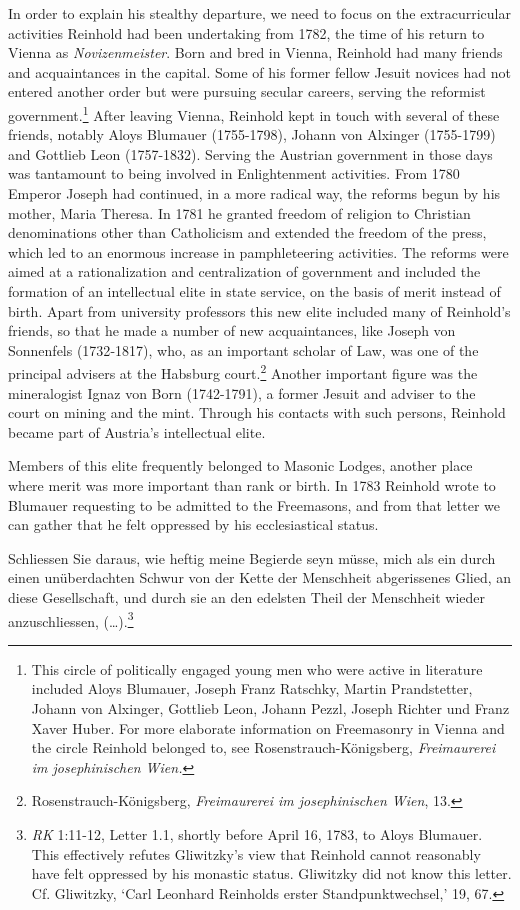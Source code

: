  In order to explain his stealthy departure, we need to focus on the extracurricular activities Reinhold had been undertaking from 1782, the time of his return to Vienna as \textit{Novizenmeister}. Born and bred in Vienna, Reinhold had many friends and acquaintances in the capital. Some of his former fellow Jesuit novices had not entered another order but were pursuing secular careers, serving the reformist government.\footnote{ This circle of politically engaged young men who were active in literature included Aloys Blumauer, Joseph Franz Ratschky, Martin Prandstetter, Johann von Alxinger, Gottlieb Leon, Johann Pezzl, Joseph Richter und Franz Xaver Huber. For more elaborate information on Freemasonry in Vienna and the circle Reinhold belonged to, see Rosenstrauch{-}K\"{o}nigsberg, \textit{Freimaurerei im josephinischen Wien. }} After leaving Vienna, Reinhold kept in touch with several of these friends, notably Aloys Blumauer (1755{-}1798), Johann von Alxinger (1755{-}1799) and Gottlieb Leon (1757{-}1832). Serving the Austrian government in those days was tantamount to being involved in Enlightenment activities. From 1780 Emperor Joseph had continued, in a more radical way, the reforms begun by his mother, Maria Theresa. In 1781 he granted freedom of religion to Christian denominations other than Catholicism and extended the freedom of the press, which led to an enormous increase in pamphleteering activities. The reforms were aimed at a rationalization and centralization of government and included the formation of an intellectual elite in state service, on the basis of merit instead of birth. Apart from university professors this new elite included many of Reinhold's friends, so that he made a number of new acquaintances, like Joseph von Sonnenfels (1732{-}1817), who, as an important scholar of Law, was one of the principal advisers at the Habsburg court.\footnote{ Rosenstrauch{-}K\"{o}nigsberg, \textit{Freimaurerei im josephinischen Wien}, 13.} Another important figure was the mineralogist Ignaz von Born (1742{-}1791), a former Jesuit and adviser to the court on mining and the mint. Through his contacts with such persons, Reinhold became part of Austria's intellectual elite. 

Members of this elite frequently belonged to Masonic Lodges, another place where merit was more important than rank or birth. In 1783 Reinhold wrote to Blumauer requesting to be admitted to the Freemasons, and from that letter we can gather that he felt oppressed by his ecclesiastical status. 

Schliessen Sie daraus, wie heftig meine Begierde seyn m\"{u}sse, mich als ein durch einen un\"{u}berdachten Schwur von der Kette der Menschheit abgerissenes Glied, an diese Gesellschaft, und durch sie an den edelsten Theil der Menschheit wieder anzuschliessen, (\ldots ).\footnote{ \textit{RK} 1:11{-}12, Letter 1.1, shortly before April 16, 1783, to Aloys Blumauer. This effectively refutes Gliwitzky's view that Reinhold cannot reasonably have felt oppressed by his monastic status. Gliwitzky did not know this letter. Cf. Gliwitzky, `Carl Leonhard Reinholds erster Standpunktwechsel,' 19, 67. }

